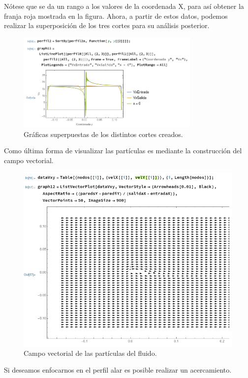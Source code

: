 \documentclass[12pt, letterpaper]{article}
\begin{document}
Nótese que se da un rango a los valores de la coordenada X, para así obtener la franja roja mostrada en la figura. Ahora, a partir de estos datos, podemos realizar la superposición de los tres cortes para su análisis posterior.

\begin{figure}[H]
	\centering
	\includegraphics[width=0.8\textwidth]{22.png}
	\caption{Gráficas superpuestas de los distintos cortes creados.}
\end{figure}

Como última forma de visualizar las partículas es mediante la construcción del campo vectorial.

\begin{figure}[H]
	\centering
	\includegraphics[width=\textwidth]{24.png}
	\caption{Campo vectorial de las partículas del fluido.}
\end{figure}

Si deseamos enfocarnos en el perfil alar es posible realizar un acercamiento.
\end{document}
